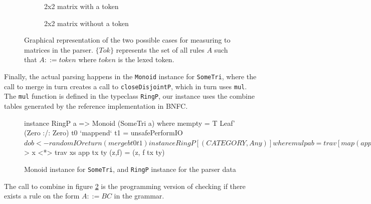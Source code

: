 \documentclass[a4paper,12pt,notitlepage]{report}
\begin{document}
\begin{figure}[H]
\begin{subfigure}[H]{.45\textwidth}
    \centering
\caption{\small 2x2 matrix with a token}
\end{subfigure}
\hfill
\begin{subfigure}[H]{.45\textwidth}
    \centering
\caption{\small 2x2 matrix without a token}
\end{subfigure}
\caption{\label{measurematrix} \small Graphical representation of the two
possible cases for measuring to matrices in the parser. $\{Tok\}$ represents the
set of all rules $A$ such that $A ::= token$ where $token$ is the lexed token.}
\end{figure}

Finally, the actual parsing happens in the \texttt{Monoid} instance for
\texttt{SomeTri}, where the call to merge in turn creates a call to
\texttt{closeDisjointP}, which in turn uses \texttt{mul}. The \texttt{mul}
function is defined in the typeclass \texttt{RingP}, our instance uses the
combine tables generated by the reference implementation in BNFC.

\begin{figure}[H]
\begin{code}
instance RingP a => Monoid (SomeTri a) where
    mempty = T Leaf' (Zero :/: Zero)
    t0 `mappend` t1 = unsafePerformIO $ do
      b <- randomIO
      return (merge b t0 t1)

instance RingP [(CATEGORY,Any)] where
  mul p a b = trav [map (app tx ty) l :/: map (app tx ty) r 
                   | (x,tx) <- a, (y,ty) <- b
                   , let l:/:r = combine p x y]
    where trav :: [Pair [a]] -> Pair [a]
          trav [] = pure []
          trav (x:xs) = (++) <$> x <*> trav xs
          app tx ty (z,f)  = (z, f tx ty)
\end{code}
\caption{\label{parsemonoid} \small Monoid instance for \texttt{SomeTri}, and
\texttt{RingP} instance for the parser data}
\end{figure}
The call to combine in figure \ref{parsemonoid} is the programming version of
checking if there exists a rule on the form $A ::= BC$ in the grammar.
\end{document}

